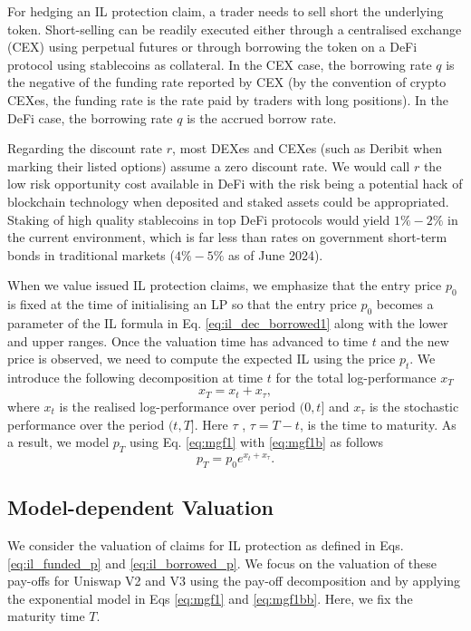 \documentclass[pdftex,11pt,a4paper] {article}
\begin{document}
For hedging an IL protection claim, a trader needs to sell short the
underlying token. Short-selling can be readily executed either through a
centralised exchange (CEX) using perpetual futures or through borrowing the
token on a DeFi protocol using stablecoins as collateral. In the CEX case,
the borrowing rate $q$ is the negative of the funding rate reported by CEX (by
the convention of crypto CEXes, the funding rate is the rate paid by traders
with long positions). In the DeFi case, the borrowing rate $q$ is the accrued
borrow rate.

Regarding the discount rate $r$, most DEXes and CEXes (such as Deribit when
marking their listed options) assume a zero discount rate. We would call $r$
the low risk opportunity cost available in DeFi with the risk being a
potential hack of blockchain technology when deposited and staked assets
could be appropriated. Staking of high quality stablecoins in top DeFi
protocols would yield $1\%-2\%$ in the current environment, which is far
less than rates on government short-term bonds in traditional markets ($%
4\%-5\%$ as of June 2024).

When we value issued IL protection claims, we emphasize that the entry price
$p_{0}$ is fixed at the time of initialising an LP so that the entry
price $p_{0}$ becomes a parameter of the IL formula in Eq. %
\eqref{eq:il_dec_borrowed1} along with the lower and upper ranges. Once the
valuation time has advanced to time $t$ and the new price is observed, we need to
compute the expected IL using the price $p_{t}$. We introduce the following
decomposition at time $t$ for the total log-performance $x_{T}$
\begin{equation}  \label{eq:mgf1b}
x_{T} = x_{t} + x_{\tau},
\end{equation}
where $x_{t}$ is the realised log-performance over period $(0, t]$ and $%
x_{\tau}$ is the stochastic performance over the period $(t, T]$. Here $\tau$%
, $\tau=T-t$, is the time to maturity. As a result, we model $p_{T}$ using
Eq. \eqref{eq:mgf1} with \eqref{eq:mgf1b} as follows
\begin{equation}  \label{eq:mgf1bb}
p_{T}=p_{0}e^{x_{t} + x_{\tau} }.
\end{equation}

\subsection{Model-dependent Valuation}

We consider the valuation of claims for IL protection as defined in Eqs. \eqref{eq:il_funded_p} and \eqref{eq:il_borrowed_p}. We focus on the
valuation of these pay-offs for Uniswap V2 and V3 using the pay-off
decomposition and by applying the exponential model in Eqs \eqref{eq:mgf1}
and \eqref{eq:mgf1bb}. Here, we fix the maturity time $T$.
\end{document}
